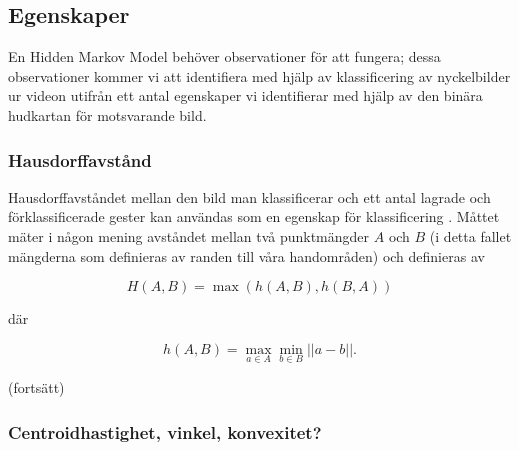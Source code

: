 \documentclass[../rapport_MVEX01-11-05]{subfiles}
\begin{document}
\subsection{Egenskaper}
En Hidden Markov Model behöver observationer för att fungera; dessa
observationer kommer vi att identifiera med hjälp av klassificering av
nyckelbilder ur videon utifrån ett antal egenskaper vi identifierar
med hjälp av den binära hudkartan för motsvarande bild.

\subsubsection{Hausdorffavstånd}

Hausdorffavståndet mellan den bild man klassificerar och ett antal
lagrade och förklassificerade gester kan användas som en egenskap för
klassificering \cite{Nielsen04}. Måttet mäter i någon mening avståndet
mellan två punktmängder $A$ och $B$ (i detta fallet mängderna som definieras av
randen till våra handområden) och definieras av

\begin{equation*}
  H(A, B) = \max\left(h(A,B),h(B, A)\right)
\end{equation*}

där

\begin{equation*}
  h(A, B) = \max\limits_{a\in A}\min\limits_{b\in
  B}\left|\left|a-b\right|\right|.
\end{equation*}

(fortsätt)

\subsubsection{Centroidhastighet, vinkel, konvexitet?}
\end{document}
